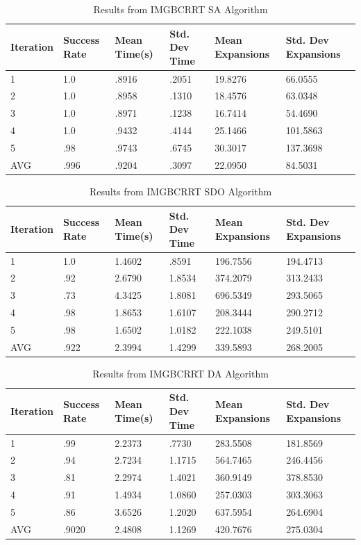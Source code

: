 \documentclass{article}
\begin{document}
\begin{table}[hbt!]
  \caption{Results from IMGBCRRT SA Algorithm}
  \label{IMGBCRRT SA Results}
        \centering
  \begin{tabular}{llllll}
    \cmidrule(r){1-6}
   Iteration & Success Rate & Mean Time(s) & Std. Dev Time & Mean Expansions & Std. Dev Expansions\\
    \midrule
    1 & 1.0 & .8916 & .2051 & 19.8276 & 66.0555 \\
    2 & 1.0 & .8958 & .1310 & 18.4576 & 63.0348 \\
    3 & 1.0 & .8971 & .1238 & 16.7414 & 54.4690 \\
    4 & 1.0 & .9432 & .4144 & 25.1466 & 101.5863 \\
    5 & .98 & .9743 & .6745 & 30.3017 & 137.3698 \\
 \midrule
  AVG & .996 & .9204 & .3097 & 22.0950 & 84.5031 \\
    \bottomrule
  \end{tabular}
\end{table}

\begin{table}[hbt!]
  \caption{Results from IMGBCRRT SDO Algorithm}
  \label{IMGBCRRT SDO Results}
  \centering
  \begin{tabular}{llllll}
    \cmidrule(r){1-6}
   Iteration & Success Rate & Mean Time(s) & Std. Dev Time & Mean Expansions & Std. Dev Expansions\\
    \midrule
    1 & 1.0 & 1.4602 & .8591 & 196.7556 & 194.4713 \\
    2 & .92 & 2.6790 & 1.8534 & 374.2079 & 313.2433 \\
    3 & .73 & 4.3425 & 1.8081 & 696.5349 & 293.5065 \\
    4 & .98 & 1.8653 & 1.6107 & 208.3444 & 290.2712 \\
    5 & .98 & 1.6502 & 1.0182 & 222.1038 & 249.5101 \\
 \midrule
  AVG & .922 & 2.3994 & 1.4299 & 339.5893 & 268.2005 \\
    \bottomrule
  \end{tabular}
\end{table}

\begin{table}[hbt!]
  \caption{Results from IMGBCRRT DA Algorithm}
  \label{IMGBCRRT DA Results}
  \centering
  \begin{tabular}{llllll}
    \cmidrule(r){1-6}
   Iteration & Success Rate & Mean Time(s) & Std. Dev Time & Mean Expansions & Std. Dev Expansions\\
    \midrule
    1 & .99 & 2.2373 & .7730 & 283.5508 & 181.8569 \\
    2 & .94 & 2.7234 & 1.1715 & 564.7465 & 246.4456 \\
    3 & .81 & 2.2974 & 1.4021 & 360.9149 & 378.8530 \\
    4 & .91 & 1.4934 & 1.0860 & 257.0303 & 303.3063 \\
    5 & .86 & 3.6526 & 1.2020 & 637.5954 & 264.6904 \\
 \midrule
  AVG & .9020 & 2.4808 & 1.1269 & 420.7676 & 275.0304 \\
    \bottomrule
  \end{tabular}
\end{table}
\end{document}
